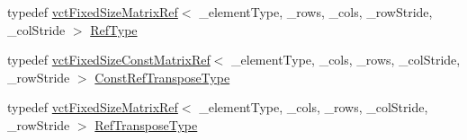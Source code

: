 \begin{DoxyCompactItemize}
\item 
typedef \hyperlink{classvct_fixed_size_matrix_ref}{vct\+Fixed\+Size\+Matrix\+Ref}$<$ \+\_\+element\+Type, \+\_\+rows, \+\_\+cols, \+\_\+row\+Stride, \+\_\+col\+Stride $>$ \hyperlink{classvct_fixed_size_const_matrix_base_a9745538b98120d767fe2b9a9ba984e80}{Ref\+Type}
\item 
typedef \hyperlink{classvct_fixed_size_const_matrix_ref}{vct\+Fixed\+Size\+Const\+Matrix\+Ref}$<$ \+\_\+element\+Type, \+\_\+cols, \+\_\+rows, \+\_\+col\+Stride, \+\_\+row\+Stride $>$ \hyperlink{classvct_fixed_size_const_matrix_base_a41d41a9a3dc6d0c8e36348a8c2fc83db}{Const\+Ref\+Transpose\+Type}
\item 
typedef \hyperlink{classvct_fixed_size_matrix_ref}{vct\+Fixed\+Size\+Matrix\+Ref}$<$ \+\_\+element\+Type, \+\_\+cols, \+\_\+rows, \+\_\+col\+Stride, \+\_\+row\+Stride $>$ \hyperlink{classvct_fixed_size_const_matrix_base_a8d6e7ad2cf2cd82aebbc3de0d6479dbe}{Ref\+Transpose\+Type}
\item 

\end{DoxyCompactItemize}
